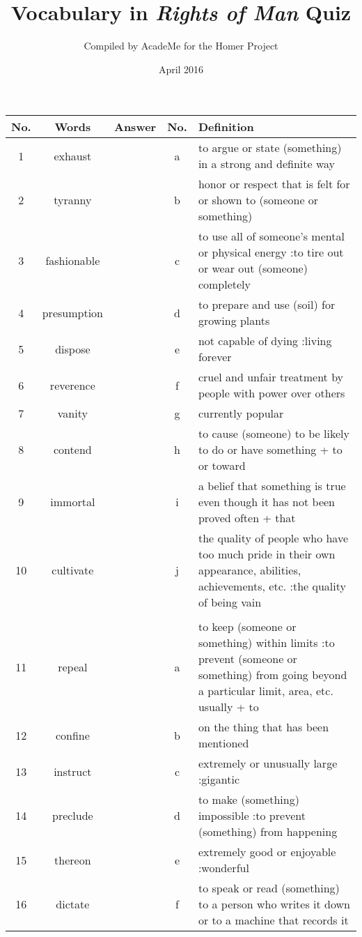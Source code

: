 \documentclass[a4paper]{article}
\title{Vocabulary in \textit{Rights of Man} Quiz}
\author{Compiled by AcadeMe for the Homer Project}
\date{April 2016}
\begin{document}
\maketitle
\begin{center}
\begin{tabular}{|c|c|c|c|m{}|}
\hline
No. & Words & Answer & No. & Definition \\
\hline
 1 & exhaust & & a &  to argue or state (something) in a strong and definite way \\
\hline
 2 & tyranny & & b &  honor or respect that is felt for or shown to (someone or something) \\
\hline
 3 & fashionable & & c &  to use all of someone's mental or physical energy :to tire out or wear out (someone) completely \\
\hline
 4 & presumption & & d &  to prepare and use (soil) for growing plants \\
\hline
 5 & dispose & & e &  not capable of dying :living forever \\
\hline
 6 & reverence & & f &  cruel and unfair treatment by people with power over others \\
\hline
 7 & vanity & & g &  currently popular \\
\hline
 8 & contend & & h &  to cause (someone) to be likely to do or have something + to or toward \\
\hline
 9 & immortal & & i &  a belief that something is true even though it has not been proved often + that \\
\hline
 10 & cultivate & & j &  the quality of people who have too much pride in their own appearance, abilities, achievements, etc. :the quality of being vain \\
\hline
 & & & & \\
\hline
 11 & repeal & & a &  to keep (someone or something) within limits :to prevent (someone or something) from going beyond a particular limit, area, etc. usually + to \\
\hline
 12 & confine & & b &  on the thing that has been mentioned \\
\hline
 13 & instruct & & c &  extremely or unusually large :gigantic \\
\hline
 14 & preclude & & d &  to make (something) impossible :to prevent (something) from happening \\
\hline
 15 & thereon & & e &  extremely good or enjoyable :wonderful \\
\hline
 16 & dictate & & f &  to speak or read (something) to a person who writes it down or to a machine that records it \\

\end{tabular}
\end{center}
\end{document}
